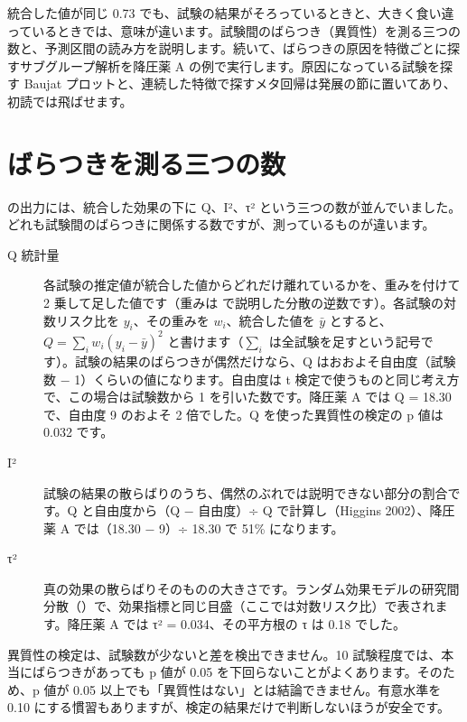 \begin{chapintro}
統合した値が同じ 0.73 でも、試験の結果がそろっているときと、大きく食い違っているときでは、意味が違います。試験間のばらつき（異質性）を測る三つの数と、予測区間の読み方を説明します。続いて、ばらつきの原因を特徴ごとに探すサブグループ解析を降圧薬 A の例で実行します。原因になっている試験を探す Baujat プロットと、連続した特徴で探すメタ回帰は発展の節に置いてあり、初読では飛ばせます。
\end{chapintro}

\section{ばらつきを測る三つの数}
\label{sec:06-1}

 の出力には、統合した効果の下に Q、I²、τ² という三つの数が並んでいました。どれも試験間のばらつきに関係する数ですが、測っているものが違います。

\begin{description}
\item[Q 統計量] 各試験の推定値が統合した値からどれだけ離れているかを、重みを付けて 2 乗して足した値です（重みは  で説明した分散の逆数です）。各試験の対数リスク比を $y_i$、その重みを $w_i$、統合した値を $\bar{y}$ とすると、$Q = \sum_i w_i (y_i - \bar{y})^2$ と書けます（$\sum_i$ は全試験を足すという記号です）。試験の結果のばらつきが偶然だけなら、Q はおおよそ自由度（試験数 − 1）くらいの値になります。自由度は t 検定で使うものと同じ考え方で、この場合は試験数から 1 を引いた数です。降圧薬 A では Q = 18.30 で、自由度 9 のおよそ 2 倍でした。Q を使った異質性の検定の p 値は 0.032 です。
\item[I²] 試験の結果の散らばりのうち、偶然のぶれでは説明できない部分の割合です。Q と自由度から（Q − 自由度）÷ Q で計算し（Higgins 2002）、降圧薬 A では（18.30 − 9）÷ 18.30 で 51\% になります。
\item[τ²] 真の効果の散らばりそのものの大きさです。ランダム効果モデルの研究間分散（）で、効果指標と同じ目盛（ここでは対数リスク比）で表されます。降圧薬 A では τ² = 0.034、その平方根の τ は 0.18 でした。
\end{description}

異質性の検定は、試験数が少ないと差を検出できません。10 試験程度では、本当にばらつきがあっても p 値が 0.05 を下回らないことがよくあります。そのため、p 値が 0.05 以上でも「異質性はない」とは結論できません。有意水準を 0.10 にする慣習もありますが、検定の結果だけで判断しないほうが安全です。

